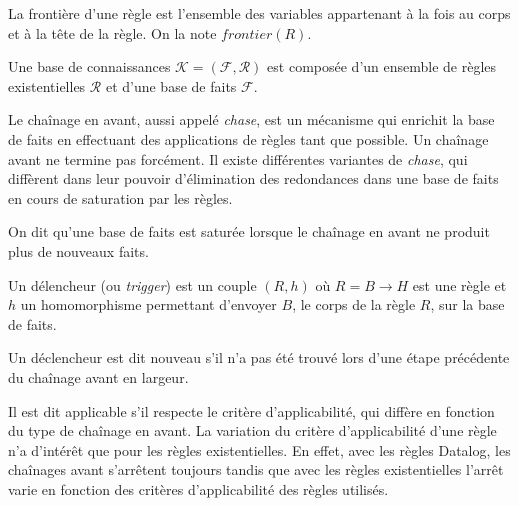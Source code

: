 
\begin{definition}[Frontière]\label{def:frontier}
La frontière d'une règle est l'ensemble des variables appartenant à la fois au corps et à la tête de la règle. On la note $frontier(R)$.
\end{definition}


\begin{definition}
Une base de connaissances $\mathcal{K} = (\mathcal{F}, \mathcal{R})$ est composée d'un ensemble de règles existentielles $\mathcal{R}$ et d'une base de faits $\mathcal{F}$.
\end{definition}

\begin{definition}
Le chaînage en avant, aussi appelé \textit{chase}, est un mécanisme qui enrichit la base de faits en effectuant des applications de règles tant que possible. Un chaînage avant ne termine pas forcément.
Il existe différentes variantes de \textit{chase}, qui diffèrent dans leur pouvoir d'élimination des redondances dans une base de faits en cours de saturation par les règles.
\par On dit qu'une base de faits est saturée lorsque le chaînage en avant ne produit plus de nouveaux faits.
\end{definition}

\begin{definition}[Déclencheur]\label{def:declencheur} 
Un délencheur (ou \textit{trigger}) est un couple $(R,h)$ où $R = B \rightarrow H$ est une règle et $h$ un homomorphisme permettant d'envoyer $B$, le corps de la règle $R$, sur la base de faits.
\par Un déclencheur est dit nouveau s'il n'a pas été trouvé lors d'une étape précédente du chaînage avant en largeur.
\par Il est dit applicable s'il respecte le critère d'applicabilité, qui diffère en fonction du type de chaînage en avant. La variation du critère d'applicabilité d'une règle n'a d'intérêt que pour les règles existentielles. En effet, avec les règles Datalog, les chaînages avant s'arrêtent toujours tandis que avec les règles existentielles l'arrêt varie en fonction des critères d'applicabilité des règles utilisés.
\end{definition}


